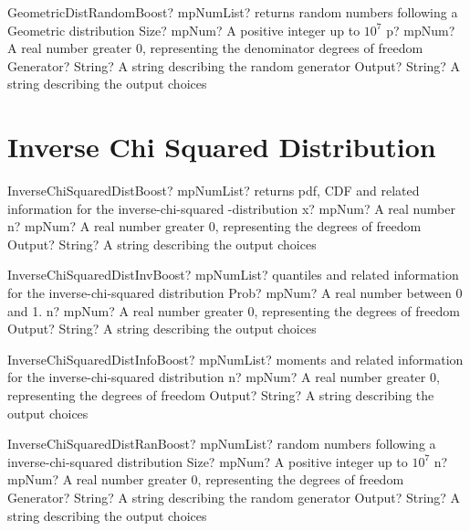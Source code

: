 \documentclass[12pt,a4paper,openany]{book}
\begin{document}
\begin{mpFunctionsExtract}
\mpFunctionFour
{GeometricDistRandomBoost? mpNumList? returns random numbers following a Geometric distribution}
{Size? mpNum? A positive integer up to $10^7$}
{p? mpNum? A real number greater 0, representing the denominator degrees of freedom}
{Generator? String? A string describing the random generator}
{Output? String? A string describing the output choices}
\end{mpFunctionsExtract}

\section{Inverse Chi Squared Distribution}

\begin{mpFunctionsExtract}
\mpFunctionThree
{InverseChiSquaredDistBoost? mpNumList? returns pdf, CDF and related information for the inverse-chi-squared -distribution}
{x? mpNum? A real number}
{n? mpNum? A real number greater 0, representing the degrees of freedom}
{Output? String? A string describing the output choices}
\end{mpFunctionsExtract}

\begin{mpFunctionsExtract}
\mpFunctionThree
{InverseChiSquaredDistInvBoost? mpNumList? quantiles and related information for the inverse-chi-squared distribution}
{Prob? mpNum? A real number between 0 and 1.}
{n? mpNum? A real number greater 0, representing the degrees of freedom}
{Output? String? A string describing the output choices}
\end{mpFunctionsExtract}

\begin{mpFunctionsExtract}
\mpFunctionTwo
{InverseChiSquaredDistInfoBoost? mpNumList? moments and related information for the inverse-chi-squared distribution}
{n? mpNum? A real number greater 0, representing the degrees of freedom}
{Output? String? A string describing the output choices}
\end{mpFunctionsExtract}

\begin{mpFunctionsExtract}
\mpFunctionFour
{InverseChiSquaredDistRanBoost? mpNumList? random numbers following a inverse-chi-squared distribution}
{Size? mpNum? A positive integer up to $10^7$}
{n? mpNum? A real number greater 0, representing the degrees of freedom}
{Generator? String? A string describing the random generator}
{Output? String? A string describing the output choices}
\end{mpFunctionsExtract}
\end{document}
